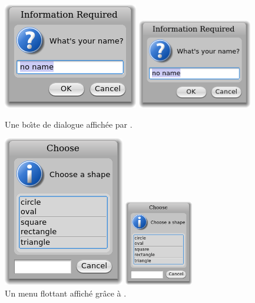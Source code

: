 \documentclass[a4paper,10pt,twoside]{book}
\begin{document}
\begin{figure}[htb]
\begin{minipage}{0.55\textwidth}
	\ifluluelse
		{\centerline{\includegraphics[scale=0.65]{dialog}}}
		{\centerline{\includegraphics[width=5cm]{dialog}}}
	\caption{Une bo\^{\i}te de dialogue affich\'ee par
      .
		\label{fig:dialogName}}
\end{minipage}
\hfill
\begin{minipage}{0.38\textwidth}
	\vfill
	\ifluluelse
		{\centerline{\includegraphics [scale=0.65]{popup}}}
		{\centerline{\includegraphics[width=3cm]{popup}}}
	\vfill
	\vspace{4ex}
	\caption{Un menu flottant affich\'e gr\^ace \`a .}
\end{minipage}
\end{figure}
\end{document}
